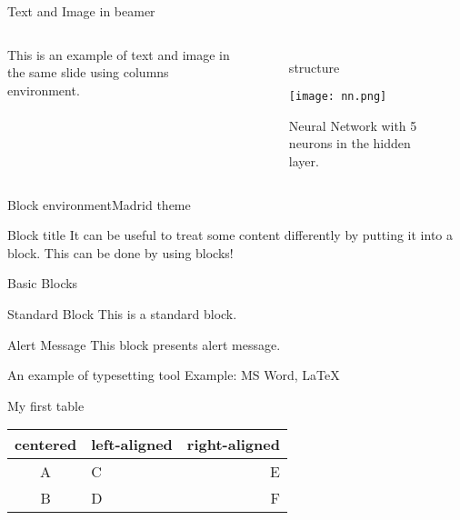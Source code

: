\documentclass{beamer}
\begin{document}
\begin{frame}{Text and Image in beamer}
    \begin{columns}
        This is an example of text and image in the same slide using columns environment.
        \begin{figure}
        \centeringtion structure

        \texttt{[image: nn.png]}
        \caption{Neural Network with 5 neurons in the hidden layer. }
        \end{figure}
    \end{columns}
\end{frame}



\begin{frame}{Block environment}{Madrid theme}
\begin{block}{Block title}
    It can be useful to treat some content differently by putting it into a block. This can be done by using blocks!
\end{block}
\end{frame}

\begin{frame}{Basic Blocks}
    \begin{block}{Standard Block}
        This is a standard block.
    \end{block}
    \begin{alertblock}{Alert Message}
        This block presents alert message.
    \end{alertblock}
    \begin{exampleblock}{An example of typesetting tool}
        Example: MS Word, \LaTeX{}
    \end{exampleblock}
\end{frame}


\begin{frame}{My first table}
\begin{tabular}{|c||l||r|}
\hline
    centered & left-aligned & right-aligned \\ 
\hline
    A & C & E\\ 
\hline
    B & D & F\\ 
\hline
\end{tabular}
\end{frame}
\end{document}
